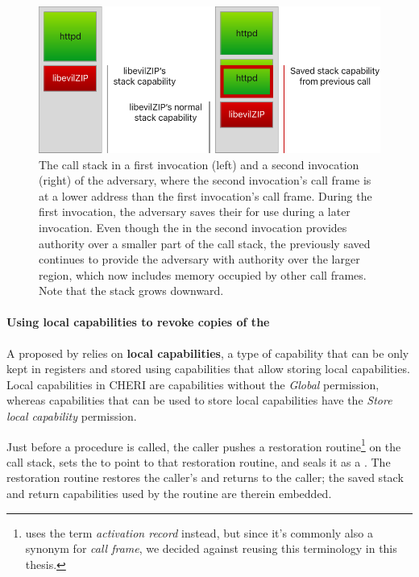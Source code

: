 \documentclass[main.tex]{subfiles}
\begin{document}
\begin{figure}
	\begin{center}
		\includegraphics{Images/Saved Stack Cap.pdf}
	\end{center}
	\caption{The call stack in a first invocation (left) and a second invocation (right) of the adversary, where the second invocation's call frame is at a lower address than the first invocation's call frame. During the first invocation, the adversary saves their  for use during a later invocation. Even though the  in the second invocation provides authority over a smaller part of the call stack, the previously saved  continues to provide the adversary with authority over the larger region, which now includes memory occupied by other call frames. Note that the stack grows downward.}
	\label{fig:savedstackcap}
\end{figure}

\paragraph{Using local capabilities to revoke copies of the } A  proposed by \cite{retptr} relies on \textbf{local capabilities}, a type of capability that can be only kept in registers and stored using capabilities that allow storing local capabilities. Local capabilities in CHERI are capabilities without the \emph{Global} permission, whereas capabilities that can be used to store local capabilities have the \emph{Store local capability} permission.

Just before a procedure is called, the caller pushes a restoration routine\footnote{\cite{retptr} uses the term \emph{activation record} instead, but since it's commonly also a synonym for \emph{call frame}, we decided against reusing this terminology in this thesis.} on the call stack, sets the  to point to that restoration routine, and seals it as a . The restoration routine restores the caller's  and returns to the caller; the saved stack and return capabilities used by the routine are therein embedded.
\end{document}
